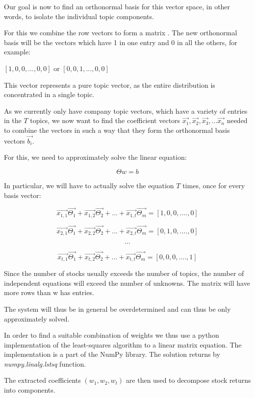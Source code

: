 \documentclass[12pt,journal,letterpaper,oneside,onecolumn]{IEEEtran}
\begin{document}
Our goal is now to find an orthonormal basis for this vector space, in other words, to isolate the individual topic components.

For this we combine the  row vectors to form a matrix .
The new orthonormal basis will be the vectors which have 1  in one entry and 0 in all the others, for example:

$[1,0,0, ... , 0,0]$ or $[0,0,1,..., 0,0]$

This vector represents a pure topic vector, as the entire distribution is concentrated in a single topic.

As we currently only have company topic vectors, which have a variety of entries in the $T$ topics, we now want to find the coefficient vectors $\vec{x_1}, \vec{x_2}, \vec{x_3}, ... \vec{x_n}$  needed to combine the vectors in such a way that they form the orthonormal basis vectors $\vec{b_i}$.

For this, we need to approximately solve the linear equation:

$$\Theta w = b$$

In particular, we will have to actually solve the equation $T$ times, once for every basis vector:

$$\vec{x_{1,1}}\vec{\Theta_1} + \vec{x_{1,2}}\vec{\Theta_2} + ... + \vec{x_{1,t}}\vec{\Theta_m} = [1,0,0, .... , 0] $$

$$\vec{x_{2,1}}\vec{\Theta_1} + \vec{x_{2,2}}\vec{\Theta_2} + ... + \vec{x_{2,t}}\vec{\Theta_m} = [0,1,0, .... , 0] $$

$$...$$

$$\vec{x_{t,1}}\vec{\Theta_1} + \vec{x_{t,2}}\vec{\Theta_2} + ... + \vec{x_{t,t}}\vec{\Theta_m} = [0,0,0, .... , 1] $$

Since the number of stocks usually exceeds the number of topics, the number of independent equations will exceed the number of unknowns. The matrix  will have more rows than w has entries.

The system will thus be in general be overdetermined and can thus be only approximately solved.

In order to find a suitable combination of weights we thus use a python implementation of the least-squares algorithm to a linear matrix equation. The implementation is a part of the NumPy library. The solution returns by \textit{numpy.linalg.lstsq}\cite{ref_linalg_numpy} function.


The extracted coefficients $(w_1, w_2, w_t)$ are then used to decompose stock returns into components.
\end{document}
